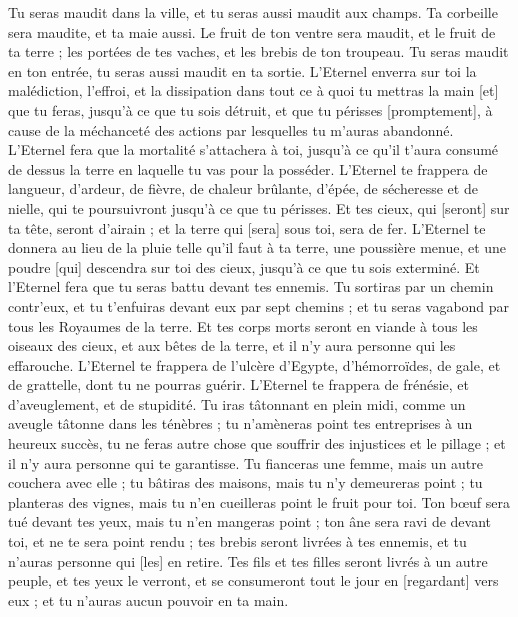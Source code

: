 \begin{multicols}{2}
Tu seras maudit dans la ville, et tu seras aussi maudit aux champs.
Ta corbeille sera maudite, et ta maie aussi.
Le fruit de ton ventre sera maudit, et le fruit de ta terre ; les portées de tes vaches, et les brebis de ton troupeau.
Tu seras maudit en ton entrée, tu seras aussi maudit en ta sortie.
L'Eternel enverra sur toi la malédiction, l'effroi, et la dissipation dans tout ce à quoi tu mettras la main [et] que tu feras, jusqu'à ce que tu sois détruit, et que tu périsses [promptement], à cause de la méchanceté des actions par lesquelles tu m'auras abandonné.
L'Eternel fera que la mortalité s'attachera à toi, jusqu'à ce qu'il t'aura consumé de dessus la terre en laquelle tu vas pour la posséder.
L'Eternel te frappera de langueur, d'ardeur, de fièvre, de chaleur brûlante, d'épée, de sécheresse et de nielle, qui te poursuivront jusqu'à ce que tu périsses.
Et tes cieux, qui [seront] sur ta tête, seront d'airain ; et la terre qui [sera] sous toi, sera de fer.
L'Eternel te donnera au lieu de la pluie telle qu'il faut à ta terre, une poussière menue, et une poudre [qui] descendra sur toi des cieux, jusqu'à ce que tu sois exterminé.
Et l'Eternel fera que tu seras battu devant tes ennemis. Tu sortiras par un chemin contr'eux, et tu t'enfuiras devant eux par sept chemins ; et tu seras vagabond par tous les Royaumes de la terre.
Et tes corps morts seront en viande à tous les oiseaux des cieux, et aux bêtes de la terre, et il n'y aura personne qui les effarouche.
L'Eternel te frappera de l'ulcère d'Egypte, d'hémorroïdes, de gale, et de grattelle, dont tu ne pourras guérir.
L'Eternel te frappera de frénésie, et d'aveuglement, et de stupidité.
Tu iras tâtonnant en plein midi, comme un aveugle tâtonne dans les ténèbres ; tu n'amèneras point tes entreprises à un heureux succès, tu ne feras autre chose que souffrir des injustices et le pillage ; et il n'y aura personne qui te garantisse.
Tu fianceras une femme, mais un autre couchera avec elle ; tu bâtiras des maisons, mais tu n'y demeureras point ; tu planteras des vignes, mais tu n'en cueilleras point le fruit pour toi.
Ton bœuf sera tué devant tes yeux, mais tu n'en mangeras point ; ton âne sera ravi de devant toi, et ne te sera point rendu ; tes brebis seront livrées à tes ennemis, et tu n'auras personne qui [les] en retire.
Tes fils et tes filles seront livrés à un autre peuple, et tes yeux le verront, et se consumeront tout le jour en [regardant] vers eux ; et tu n'auras aucun pouvoir en ta main.

\end{multicols}
